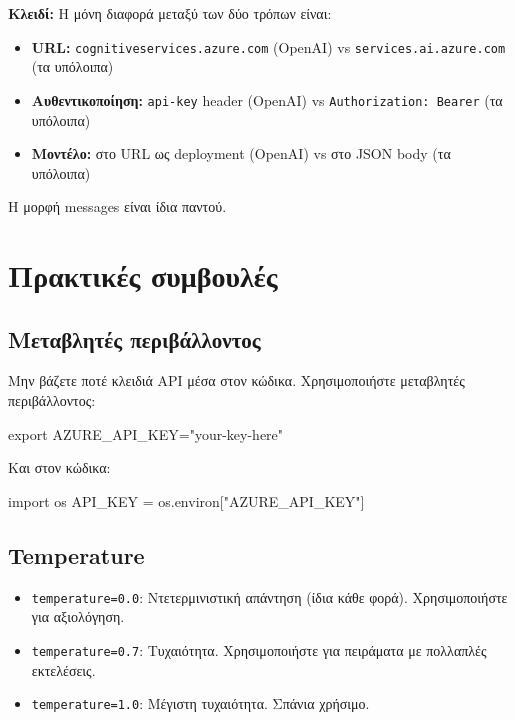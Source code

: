 \documentclass[11pt,a4paper]{article}
\begin{document}
\begin{tcolorbox}[colback=codebg, colframe=codeframe, sharp corners, boxrule=0.5pt]
\textbf{Κλειδί:} Η μόνη διαφορά μεταξύ των δύο τρόπων είναι:
\begin{itemize}[nosep,leftmargin=1.5em]
\item \textbf{URL:} \texttt{cognitiveservices.azure.com} (OpenAI) vs \texttt{services.ai.azure.com} (τα υπόλοιπα)
\item \textbf{Αυθεντικοποίηση:} \texttt{api-key} header (OpenAI) vs \texttt{Authorization: Bearer} (τα υπόλοιπα)
\item \textbf{Μοντέλο:} στο URL ως deployment (OpenAI) vs στο JSON body (τα υπόλοιπα)
\end{itemize}
Η μορφή messages είναι ίδια παντού.
\end{tcolorbox}

\section{Πρακτικές συμβουλές}

\subsection{Μεταβλητές περιβάλλοντος}

Μην βάζετε ποτέ κλειδιά API μέσα στον κώδικα. Χρησιμοποιήστε μεταβλητές περιβάλλοντος:

\begin{codeblock}[title={\smallTerminal}]
export AZURE_API_KEY="your-key-here"
\end{codeblock}

Και στον κώδικα:

\begin{codeblock}[title={\smallPython}]
import os
API_KEY = os.environ["AZURE_API_KEY"]
\end{codeblock}

\subsection{Temperature}

\begin{itemize}[nosep,leftmargin=1.5em]
\item \texttt{temperature=0.0}: Ντετερμινιστική απάντηση (ίδια κάθε φορά). Χρησιμοποιήστε για αξιολόγηση.
\item \texttt{temperature=0.7}: Τυχαιότητα. Χρησιμοποιήστε για πειράματα με πολλαπλές εκτελέσεις.
\item \texttt{temperature=1.0}: Μέγιστη τυχαιότητα. Σπάνια χρήσιμο.
\end{itemize}
\end{document}
